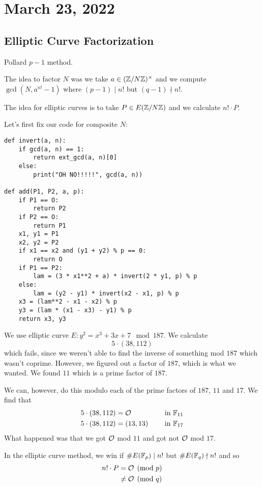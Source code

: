 \section{March 23, 2022}
\subsection{Elliptic Curve Factorization}
\recall Pollard $p-1$ method.

The idea to factor $N$ was we take $a\in (\mathbb Z/N\mathbb Z)^\times$ and we compute $\gcd(N, a^{n!} - 1)$ where $(p-1)\mid n!$ but $(q-1)\nmid n!$.

The idea for elliptic curves is to take $P\in E(\mathbb Z/N\mathbb Z)$ and we calculate $n!\cdot P$.

Let's first fix our code for composite $N$:
\begin{lstlisting}
def invert(a, n):
    if gcd(a, n) == 1:
        return ext_gcd(a, n)[0]
    else:
        print("OH NO!!!!!", gcd(a, n))

def add(P1, P2, a, p):
    if P1 == O:
        return P2
    if P2 == O:
        return P1
    x1, y1 = P1
    x2, y2 = P2
    if x1 == x2 and (y1 + y2) % p == 0:
        return O
    if P1 == P2:
        lam = (3 * x1**2 + a) * invert(2 * y1, p) % p
    else:
        lam = (y2 - y1) * invert(x2 - x1, p) % p
    x3 = (lam**2 - x1 - x2) % p
    y3 = (lam * (x1 - x3) - y1) % p
    return x3, y3
\end{lstlisting}

\begin{example}
    We use elliptic curve $E : y^2 = x^3 + 3x + 7\mod{187}$. We calculate
    \[5\cdot(38, 112)\]
    which fails, since we weren't able to find the inverse of something mod $187$ which wasn't coprime. However, we figured out a factor of $187$, which is what we wanted. We found $11$ which is a prime factor of $187$.

    We can, however, do this modulo each of the prime factors of $187$, $11$ and $17$. We find that
    \begin{alignat*}{3}
        5\cdot (38, 112) & = \mathcal{O}      &  & \quad \text{ in }\mathbb F_{11} \\
        5\cdot (38, 112) & = (13, 13) &  & \quad \text{ in }\mathbb F_{17}
    \end{alignat*}
    What happened was that we got $\mathcal{O}$ mod $11$ and got not $\mathcal{O}$ mod $17$.
\end{example}

In the elliptic curve method, we win if $\#E(\mathbb F_p)\mid n!$ but $\#E(\mathbb F_q)\nmid n!$ and so
\begin{align*}
    n!\cdot P & = \mathcal{O} \pmod{p}   \\
              & \neq \mathcal{O}\pmod{q}
\end{align*}

